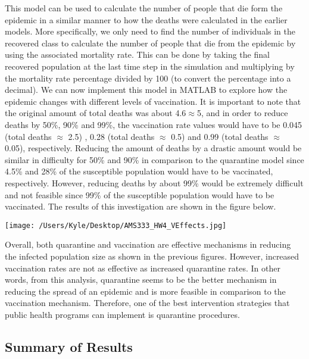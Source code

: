 \documentclass[12pt]{article}
\begin{document}
This model can be used to calculate the number of people that die form the epidemic in a similar manner to how the deaths were calculated in the earlier models. More specifically, we only need to find the number of individuals in the recovered class to calculate the number of people that die from the epidemic by using the associated mortality rate. This can be done by taking the final recovered population at the last time step in the simulation and multiplying by the mortality rate percentage divided by 100 (to convert the percentage into a decimal). We can now implement this model in MATLAB to explore how the epidemic changes with different levels of vaccination. It is important to note that the original amount of total deaths was about 4.6$\approx$5, and in order to reduce deaths by 50\%, 90\% and 99\%, the vaccination rate values would have to be 0.045 (total deaths $\approx$ 2.5) , 0.28 (total deaths $\approx$ 0.5) and 0.99 (total deaths $\approx$ 0.05), respectively. Reducing the amount of deaths by a drastic amount would be similar in difficulty for 50\% and 90\% in comparison to the quarantine model since 4.5\% and 28\% of the susceptible population would have to be vaccinated, respectively. However, reducing deaths by about 99\% would be extremely difficult and not feasible since 99\% of the susceptible population would have to be vaccinated. The results of this investigation are shown in the figure below. 
\begin{center}
   \texttt{[image: /Users/Kyle/Desktop/AMS333\_HW4\_VEffects.jpg]}
\end{center}

Overall, both quarantine and vaccination are effective mechanisms in reducing the infected population size as shown in the previous figures. However, increased vaccination rates are not as effective as increased quarantine rates. In other words, from this analysis, quarantine seems to be the better mechanism in reducing the spread of an epidemic and is more feasible in comparison to the vaccination mechanism. Therefore, one of the best intervention strategies that public health programs can implement is quarantine procedures.


\subsection*{Summary of Results}
\end{document}
